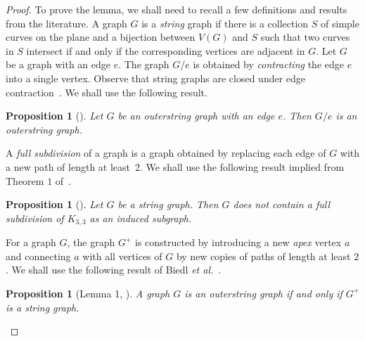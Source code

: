 \documentclass[a4paper]{article}
\newtheorem{proposition}[theorem]{Proposition}
\begin{document}
    
  \begin{proof}
 To prove the lemma, we shall need to recall a few definitions and results from the literature. A graph $G$ is a \emph{string} graph if there is a collection $S$ of simple curves on the plane and a bijection between $V(G)$ and $S$ such that two curves in $S$ intersect if and only if the corresponding vertices are adjacent in $G$. Let $G$ be a graph with an edge $e$. The graph $G/ e$ is obtained by \emph{contracting} the edge $e$ into a single vertex. Observe that string graphs are closed under edge contraction~\cite{kratochvil1991string}. We shall use the following result.

 \begin{proposition}[\cite{kratochvil1991string}]\label{prp:contract}
 Let $G$ be an outerstring graph with an edge $e$. Then $G/ e$ is an outerstring graph.
 \end{proposition}

  A \emph{full subdivision} of a graph is a graph obtained by replacing each edge of $G$ with a new path of length at least~2.  We shall use the following result implied from Theorem $1$ of~\cite{kratochvil1991string}. 

 \begin{proposition}[\cite{kratochvil1991string}]\label{prp:k33}
 Let $G$ be a string graph. Then $G$ does not contain a full subdivision of $K_{3,3}$ as an induced subgraph.
 \end{proposition}

 For a graph $G$, the graph $G^+$ is constructed by introducing a new \emph{apex} vertex $a$ and connecting $a$ with all vertices of $G$ by new copies of paths of length at least $2$. We shall use the following result of Biedl \textit{et al.}~\cite{biedl2018size}.


 \begin{proposition}[Lemma 1, \cite{biedl2018size}] \label{prp:apex-string}
 A graph $G$ is an outerstring graph if and only if $G^+$ is a string graph.
 \end{proposition}


\end{proof}
\end{document}
